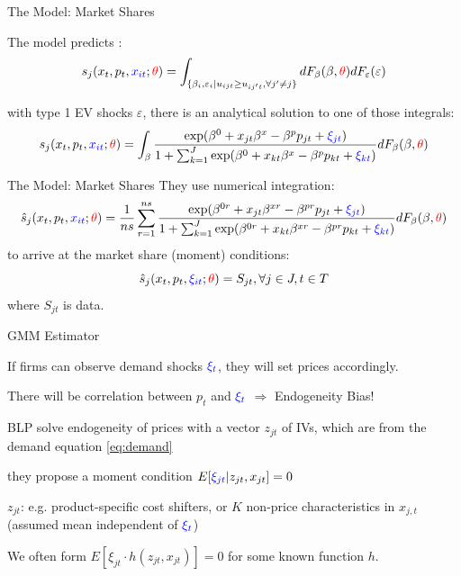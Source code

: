 \documentclass[english]{beamer}
\begin{document}
\begin{frame}{The Model: Market Shares}
\begin{midi}
\item The model predicts :
\begin{equation}
s_j(x_t,p_t,{\color{blue}{x_{it}}};{\color{red}{\theta}}) = \int_{\{\beta_i,\varepsilon_i | u_{ijt}\geq u_{ij't},\forall j'\neq j\}} dF_\beta(\beta,{\color{red}{\theta}}) dF_\varepsilon(\varepsilon)
\end{equation}
\item with type 1 EV shocks $\varepsilon$, there is an analytical solution to one of those integrals:
\begin{equation}
s_j(x_t,p_t,{\color{blue}{x_{it}}};{\color{red}{\theta}})  = \int_\beta \frac{\exp(\beta^0 + x_{jt}\beta^x - \beta^p p_{jt} + {\color{blue}{\xi_{jt}}})}{1+\sum_{k=1}^J \exp(\beta^0 + x_{kt}\beta^x - \beta^p p_{kt} + {\color{blue}{\xi_{kt}}})} dF_\beta(\beta,{\color{red}{\theta}})
\end{equation}
\end{midi}
\end{frame}

\begin{frame}{The Model: Market Shares}
They use numerical integration:
\begin{equation}
\hat{s}_j(x_t,p_t,{\color{blue}{x_{it}}};{\color{red}{\theta}})  = \frac{1}{ns} \sum_{r=1}^{ns} \frac{\exp(\beta^{0r} + x_{jt}\beta^{xr} - \beta^{pr} p_{jt} + {\color{blue}{\xi_{jt}}})}{1+\sum_{k=1}^J \exp(\beta^{0r} + x_{kt}\beta^{xr} - \beta^{pr} p_{kt} + {\color{blue}{\xi_{kt}}})} dF_\beta(\beta,{\color{red}{\theta}})
\end{equation}
to arrive at the market share (moment) conditions:
\begin{equation}
\hat{s}_j(x_t,p_t,{\color{blue}{\xi_{it}}};{\color{red}{\theta}}) = S_{jt},\forall j \in J,t\in T  \label{eq:shares}
\end{equation}
where $S_{jt}$ is data.
\end{frame}

\begin{frame}{GMM Estimator}
\begin{midi}
\item If firms can observe demand shocks ${\color{blue}{\xi_t}}$, they will set prices accordingly.
\item There will be correlation between $p_t$ and ${\color{blue}{\xi_t}}$ $\Rightarrow$ Endogeneity Bias!
\item BLP solve endogeneity of prices with a vector $z_{jt}$ of IVs, which are  from the demand equation \eqref{eq:demand}
\item they propose a moment condition $E[{\color{blue}{\xi_{jt}}}|z_{jt},x_{jt}] = 0 $
\item $z_{jt}$: e.g. product-specific cost shifters, or $K$ non-price characteristics in $x_{j,t}$ (assumed mean independent of ${\color{blue}{\xi_t}}$)
\item We often form $E[\xi_{jt} \cdot h(z_{jt},x_{jt})] = 0 $ for some known function $h$.
\end{midi}
\end{frame}
\end{document}

